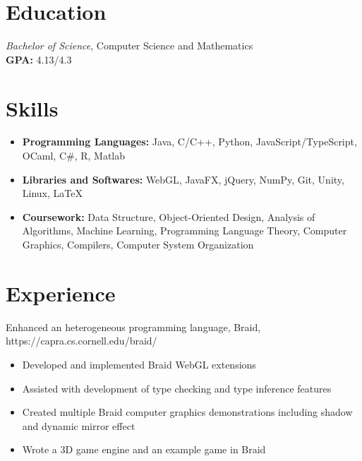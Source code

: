 \documentclass{resume}
\begin{document}



\section{Education}
\textit{Bachelor of Science}, Computer Science and Mathematics\\
\textbf{GPA: }4.13/4.3

\section{Skills}
\begin{itemize}[parsep=0.5ex]
  \item \textbf{Programming Languages:} Java, C/C++, Python, JavaScript/TypeScript, OCaml, C\#, R, Matlab
  \item \textbf{Libraries and Softwares:} WebGL, JavaFX, jQuery, NumPy, Git, Unity, Linux, \LaTeX
  \item \textbf{Coursework: }Data Structure, Object-Oriented Design, Analysis of Algorithms, Machine Learning, Programming Language Theory, Computer Graphics, Compilers, Computer System Organization
\end{itemize}

\section{Experience}
Enhanced an heterogeneous programming language, Braid, https://capra.cs.cornell.edu/braid/
\begin{itemize}
  \item Developed and implemented Braid WebGL extensions
  \item Assisted with development of type checking and type inference features
  \item Created multiple Braid computer graphics demonstrations including shadow and dynamic mirror effect
  \item Wrote a 3D game engine and an example game in Braid
\end{itemize}
\end{document}
